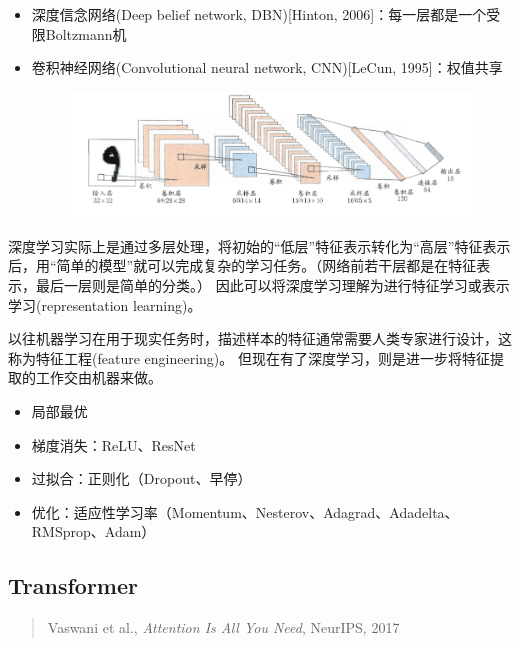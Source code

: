 \begin{itemize}
	\item 深度信念网络(Deep belief network, DBN)[Hinton, 2006]：每一层都是一个受限Boltzmann机
	\item 卷积神经网络(Convolutional neural network, CNN)[LeCun, 1995]：权值共享
\begin{figure}[H]
\centering
\includegraphics[width=0.8\linewidth]{fig/LeNet.png}
\end{figure}
\end{itemize}

深度学习实际上是通过多层处理，将初始的``低层''特征表示转化为``高层''特征表示后，用``简单的模型''就可以完成复杂的学习任务。（网络前若干层都是在特征表示，最后一层则是简单的分类。）
因此可以将深度学习理解为进行特征学习或表示学习(representation learning)。

以往机器学习在用于现实任务时，描述样本的特征通常需要人类专家进行设计，这称为特征工程(feature engineering)。
但现在有了深度学习，则是进一步将特征提取的工作交由机器来做。

\begin{itemize}
\item 局部最优
\item 梯度消失：ReLU、ResNet
\item 过拟合：正则化（Dropout、早停）
\item 优化：适应性学习率（Momentum、Nesterov、Adagrad、Adadelta、RMSprop、Adam）
\end{itemize}

\subsection{Transformer}
\begin{quote}
Vaswani et al., \emph{Attention Is All You Need}, NeurIPS, 2017
\end{quote}

